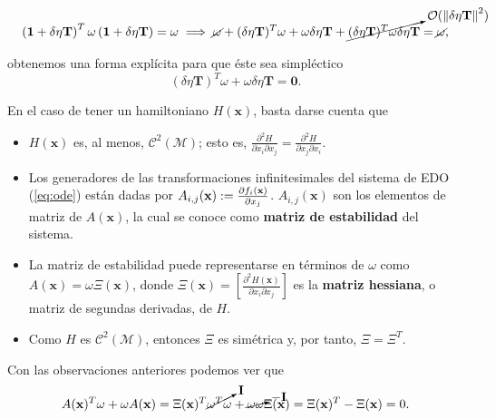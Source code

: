 \begin{align*}
  \left( \mathbf{1} + \delta \eta \mathbf{T} \right)^T \omega \left( \mathbf{1} + \delta \eta \mathbf{T} \right) = \omega \implies 
  \cancel{\omega} + (\delta \eta \mathbf{T})^T \omega + \omega \delta \eta \mathbf{T} + \cancelto{\mathcal{O}(\left\lVert\delta \eta \mathbf{T}\right\rVert^2)} {(\delta \eta \mathbf{T})^T \omega \delta \eta \mathbf{T}} = \cancel{\omega}, 
\end{align*}

obtenemos una forma explícita para que éste sea simpléctico
\begin{equation}
  (\delta \eta \mathbf{T})^T \omega + \omega \delta \eta \mathbf{T} = \mathbf{0}.
  \label{eq:eq:symplectic_condition2}
\end{equation}

En el caso de tener un hamiltoniano $H(\mathbf{x})$, basta darse cuenta que
\begin{itemize}
\item $H(\mathbf{x})$ es, al menos, $\mathcal{C}^2(\mathcal{M})$; esto es, $\frac{\partial^2 H}{\partial x_i \partial x_j} = \frac{\partial^2 H}{\partial x_j \partial x_i}$.

\item Los generadores de las transformaciones infinitesimales del sistema de EDO (\ref{eq:ode}) están dadas por $A_{i,j}(\mathbf{x}) := \frac{\partial f_i(\mathbf{x})}{\partial x_j}$. $A_{i,j}(\mathbf{x})$ son los elementos de matriz de $A(\mathbf{x})$, la cual se conoce como \textbf{matriz de estabilidad} del sistema.

\item La matriz de estabilidad puede representarse en términos de $\omega$ como $A(\mathbf{x}) = \omega \Xi(\mathbf{x})$, donde $\Xi(\mathbf{x}) = \left[ \frac{\partial^2 H(\mathbf{x})}{\partial x_i \partial x_j} \right]$ es la \textbf{matriz hessiana}, o matriz de segundas derivadas, de $H$.

\item Como $H$ es $\mathcal{C}^2(\mathcal{M})$, entonces $\Xi$ es simétrica y, por tanto, $\Xi = \Xi^T$.
\end{itemize}

Con las observaciones anteriores podemos ver que
\begin{align*}
 A(\mathbf{x})^T \omega + \omega A(\mathbf{x}) = \Xi(\mathbf{x})^T \cancelto{\mathbf{I}}{\omega^T \omega} + \cancelto{-\mathbf{I}}{\omega \omega}\Xi(\mathbf{x}) = \Xi(\mathbf{x})^T - \Xi(\mathbf{x}) = 0.
\end{align*}

